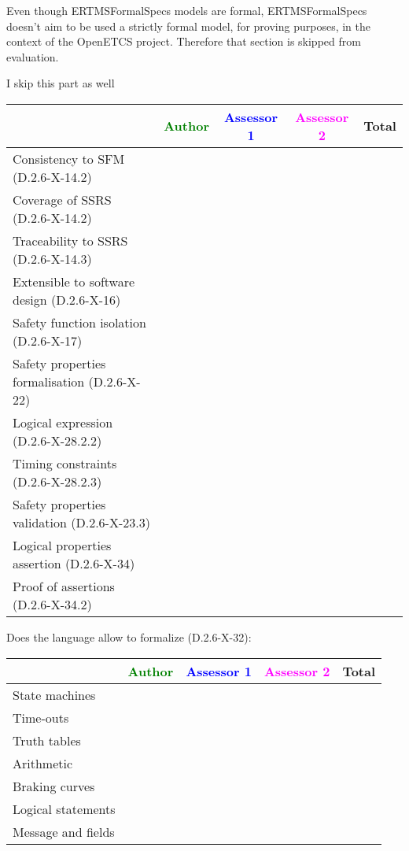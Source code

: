 \begin{author_comment}
Even though ERTMSFormalSpecs models are formal, ERTMSFormalSpecs doesn't aim to be used a strictly formal model, for proving purposes, in the context of the OpenETCS project. Therefore that section is skipped from evaluation.  
\end{author_comment}

\begin{assessor1}
I skip this part as well
\end{assessor1}

\begin{tabular}{|l | c | c | c | c|}
\hline
& \textcolor{green}{Author} & \textcolor{blue}{Assessor 1} & \textcolor{magenta}{Assessor 2} & Total \\
\hline 
Consistency to SFM (D.2.6-X-14.2) & & & &  \\
\hline
Coverage of SSRS (D.2.6-X-14.2)  & & & &  \\
\hline
Traceability to  SSRS (D.2.6-X-14.3)  & & & &  \\
\hline
Extensible to software design (D.2.6-X-16)  & & & &  \\
\hline
Safety function isolation (D.2.6-X-17)  & & & &  \\
\hline 
Safety properties formalisation (D.2.6-X-22)  & & & &  \\
\hline
Logical expression (D.2.6-X-28.2.2)  & & & &  \\
\hline
Timing constraints (D.2.6-X-28.2.3)  & & & &  \\
\hline
Safety properties validation (D.2.6-X-23.3)  & & & &  \\
\hline
Logical properties assertion (D.2.6-X-34)  & & & &  \\
\hline
Proof of assertions (D.2.6-X-34.2)  & & & &  \\
\hline
\end{tabular}

Does the language allow to  formalize (D.2.6-X-32):

\begin{tabular}{|l | c | c | c | c|}
\hline
& \textcolor{green}{Author} & \textcolor{blue}{Assessor 1} & \textcolor{magenta}{Assessor 2} & Total \\
\hline 
State machines  & & & &  \\
\hline
Time-outs  & & & &  \\
\hline
Truth tables  & & & &  \\
\hline
Arithmetic  & & & &  \\
\hline
Braking curves  & & & &  \\
\hline
Logical statements & & & &  \\
\hline
Message and fields & & & &  \\
\hline
\end{tabular}

